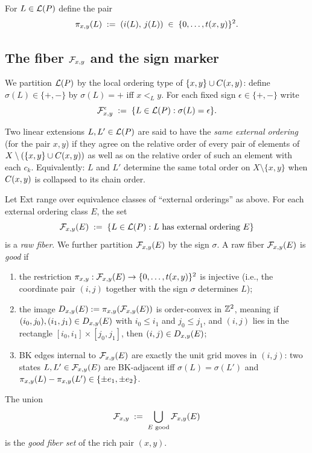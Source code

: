 \begin{definition}\label{def:local-coords}
For $L\in\mathcal{L}(P)$ define the pair
\[
\pi_{x,y}(L) \;:=\; (i(L),\,j(L)) \;\in\; \{0,\dots,t(x,y)\}^2.
\]
\end{definition}

\subsection{The fiber $\mathcal{F}_{x,y}$ and the sign marker}

We partition $\mathcal{L}(P)$ by the local ordering type of $\{x,y\}\cup C(x,y)$:
define $\sigma(L)\in\{+,-\}$ by $\sigma(L)=+$ iff $x<_L y$.
For each fixed sign $\epsilon\in\{+,-\}$ write
\[
\mathcal{F}_{x,y}^{\epsilon} \;:=\; \{L\in\mathcal{L}(P) : \sigma(L)=\epsilon\}.
\]

Two linear extensions $L,L'\in\mathcal{L}(P)$ are said to have the \emph{same external
ordering} (for the pair $x,y$) if they agree on the relative order of every
pair of elements of $X\setminus(\{x,y\}\cup C(x,y))$ as well as on the relative
order of such an element with each $c_k$. Equivalently: $L$ and $L'$ determine
the same total order on $X\setminus\{x,y\}$ when $C(x,y)$ is collapsed to its
chain order.

\begin{definition}\label{def:good-fiber}
Let $\mathrm{Ext}$ range over equivalence classes of ``external orderings''
as above. For each external ordering class $E$, the set
\[
\mathcal{F}_{x,y}(E) \;:=\; \{L\in\mathcal{L}(P) : L \text{ has external ordering } E\}
\]
is a \emph{raw fiber}.
We further partition $\mathcal{F}_{x,y}(E)$ by the sign $\sigma$.
A raw fiber $\mathcal{F}_{x,y}(E)$ is \emph{good} if
\begin{enumerate}[label=(G\arabic*),nosep]
\item\label{cond:G1} the restriction $\pi_{x,y}:\mathcal{F}_{x,y}(E)\to\{0,\dots,t(x,y)\}^2$ is injective (i.e., the coordinate pair $(i,j)$ together with the sign $\sigma$ determines $L$);
\item\label{cond:G2} the image $D_{x,y}(E):=\pi_{x,y}(\mathcal{F}_{x,y}(E))$ is order-convex in $\mathbb{Z}^2$, meaning if $(i_0,j_0),(i_1,j_1)\in D_{x,y}(E)$ with $i_0\le i_1$ and $j_0\le j_1$, and $(i,j)$ lies in the rectangle $[i_0,i_1]\times[j_0,j_1]$, then $(i,j)\in D_{x,y}(E)$;
\item\label{cond:G3} BK edges internal to $\mathcal{F}_{x,y}(E)$ are exactly the unit grid moves in $(i,j)$: two states $L,L'\in\mathcal{F}_{x,y}(E)$ are BK-adjacent iff $\sigma(L)=\sigma(L')$ and $\pi_{x,y}(L)-\pi_{x,y}(L')\in\{\pm e_1,\pm e_2\}$.
\end{enumerate}
The union
\[
\mathcal{F}_{x,y} \;:=\; \bigcup_{E\text{ good}} \mathcal{F}_{x,y}(E)
\]
is the \emph{good fiber set} of the rich pair $(x,y)$.
\end{definition}

